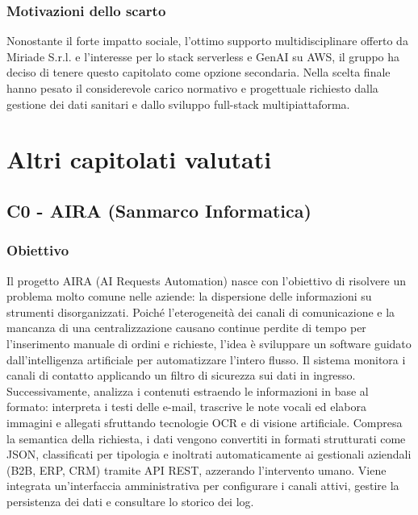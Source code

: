 \documentclass[11pt, a4paper]{article}
\begin{document}
\subsubsection{Motivazioni dello scarto}
Nonostante il forte impatto sociale, l'ottimo supporto multidisciplinare offerto da Miriade S.r.l. e l'interesse per lo stack serverless e GenAI su AWS, il gruppo ha deciso di tenere questo capitolato come opzione secondaria. \newline
Nella scelta finale hanno pesato il considerevole carico normativo e progettuale richiesto dalla gestione dei dati sanitari e dallo sviluppo full-stack multipiattaforma.

\section{Altri capitolati valutati}

\subsection{C0 - AIRA (Sanmarco Informatica)}

\subsubsection{Obiettivo}
Il progetto AIRA (AI Requests Automation) nasce con l'obiettivo di risolvere un problema molto comune nelle aziende: la dispersione delle informazioni su strumenti disorganizzati. Poiché l'eterogeneità dei canali di comunicazione e la mancanza di una centralizzazione causano continue perdite di tempo per l'inserimento manuale di ordini e richieste, l'idea è sviluppare un software guidato dall'intelligenza artificiale per automatizzare l'intero flusso. \newline
Il sistema monitora i canali di contatto applicando un filtro di sicurezza sui dati in ingresso. Successivamente, analizza i contenuti estraendo le informazioni in base al formato: interpreta i testi delle e-mail, trascrive le note vocali ed elabora immagini e allegati sfruttando tecnologie OCR e di visione artificiale. \newline
Compresa la semantica della richiesta, i dati vengono convertiti in formati strutturati come JSON, classificati per tipologia e inoltrati automaticamente ai gestionali aziendali (B2B, ERP, CRM) tramite API REST, azzerando l'intervento umano. Viene integrata un'interfaccia amministrativa per configurare i canali attivi, gestire la persistenza dei dati e consultare lo storico dei log.
\end{document}
